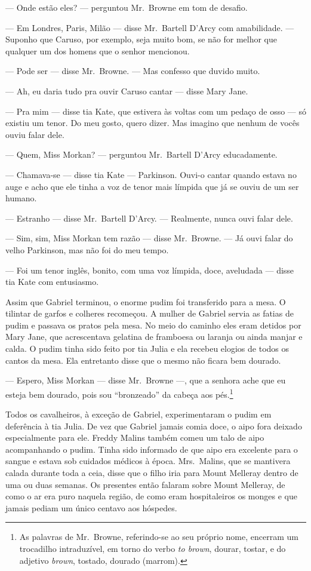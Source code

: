 --- Onde estão eles? --- perguntou Mr.~Browne em tom de desafio.

--- Em Londres, Paris, Milão --- disse Mr.~Bartell D’Arcy com amabilidade.  ---
Suponho que Caruso, por exemplo, seja muito bom, se não for melhor que qualquer
um dos homens que o senhor mencionou.

--- Pode ser --- disse Mr.~Browne.  --- Mas confesso que duvido muito.

--- Ah, eu daria tudo pra ouvir Caruso cantar --- disse Mary Jane.

--- Pra mim --- disse tia Kate, que estivera às voltas com um pedaço de osso
--- só existiu um tenor.  Do meu gosto, quero dizer.  Mas imagino que nenhum de
vocês ouviu falar dele.

--- Quem, Miss Morkan? --- perguntou Mr.~Bartell D’Arcy educadamente.

--- Chamava-se --- disse tia Kate --- Parkinson.  Ouvi-o cantar quando estava
no auge e acho que ele tinha a voz de tenor mais límpida que já se ouviu de um
ser humano.

--- Estranho --- disse Mr.~Bartell D’Arcy.  --- Realmente, nunca ouvi falar
dele.

--- Sim, sim, Miss Morkan tem razão --- disse Mr.~Browne.  --- Já ouvi falar do
velho Parkinson, mas não foi do meu tempo.

--- Foi um tenor inglês, bonito, com uma voz límpida, doce, aveludada --- disse
tia Kate com entusiasmo.

Assim que Gabriel terminou, o enorme pudim foi transferido para a mesa.  O
tilintar de garfos e colheres recomeçou.  A mulher de Gabriel servia as fatias
de pudim e passava os pratos pela mesa.  No meio do caminho eles eram detidos
por Mary Jane, que acrescentava gelatina de framboesa ou laranja ou ainda
manjar e calda.  O pudim tinha sido feito por tia Julia e ela recebeu elogios
de todos os cantos da mesa.  Ela entretanto disse que o mesmo não ficara bem
dourado.

--- Espero, Miss Morkan --- disse Mr.~Browne ---, que a senhora ache que eu
esteja bem dourado, pois sou “bronzeado” da cabeça aos pés.\footnote{ As
palavras de Mr.~Browne, referindo-se ao seu próprio nome, encerram um
trocadilho intraduzível, em torno do verbo \textit{to brown}, dourar, tostar, e
do adjetivo \textit{brown}, tostado, dourado (marrom).}

Todos os cavalheiros, à exceção de Gabriel, experimentaram o pudim em
deferência à tia Julia.  De vez que Gabriel jamais comia doce, o aipo fora
deixado especialmente para ele.  Freddy Malins também comeu um talo de aipo
acompanhando o pudim.  Tinha sido informado de que aipo era excelente para o
sangue e estava sob cuidados médicos à época.  Mrs.~Malins, que se mantivera
calada durante toda a ceia, disse que o filho iria para Mount Melleray dentro
de uma ou duas semanas.  Os presentes então falaram sobre Mount Melleray, de
como o ar era puro naquela região, de como eram hospitaleiros os monges e que       \enlargethispage{.4em}
jamais pediam um único centavo aos hóspedes.

